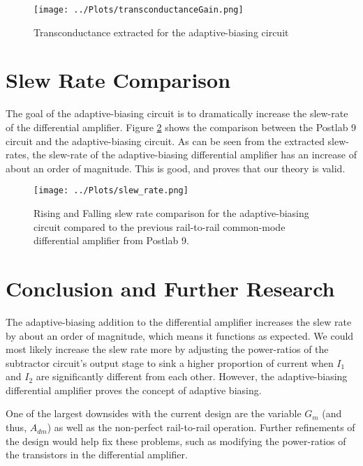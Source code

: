 \documentclass{article}
\begin{document}
        \begin{figure}[h!]
            \centering
            \texttt{[image: ../Plots/transconductanceGain.png]}
            \caption{Transconductance extracted for the adaptive-biasing circuit}
            \label{fig:transconductance}
        \end{figure}

\section{Slew Rate Comparison}

    The goal of the adaptive-biasing circuit is to dramatically increase the slew-rate of the differential amplifier. Figure \ref{fig:slew_rate} shows the comparison between the Postlab 9 circuit and the adaptive-biasing circuit. As can be seen from the extracted slew-rates, the slew-rate of the adaptive-biasing differential amplifier has an increase of about an order of magnitude. This is good, and proves that our theory is valid.

    \begin{figure}[h]
        \centering
        \texttt{[image: ../Plots/slew\_rate.png]}
        \caption{Rising and Falling slew rate comparison for the adaptive-biasing circuit compared to the previous rail-to-rail common-mode differential amplifier from Postlab 9.}
        \label{fig:slew_rate}
    \end{figure}


\section{Conclusion and Further Research}

    The adaptive-biasing addition to the differential amplifier increases the slew rate by about an order of magnitude, which means it functions as expected. We could most likely increase the slew rate more by adjusting the power-ratios of the subtractor circuit's output stage to sink a higher proportion of current when $I_1$ and $I_2$ are significantly different from each other. However, the adaptive-biasing differential amplifier proves the concept of adaptive biasing.

    One of the largest downsides with the current design are the variable $G_{m}$ (and thus, $A_{dm}$) as well as the non-perfect rail-to-rail operation. Further refinements of the design would help fix these problems, such as modifying the power-ratios of the transistors in the differential amplifier.
\end{document}
